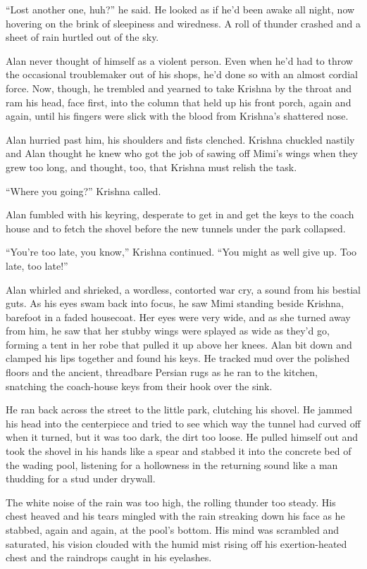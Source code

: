 ``Lost another one, huh?'' he said.  He looked as if he'd been awake
all night, now hovering on the brink of sleepiness and wiredness.  A
roll of thunder crashed and a sheet of rain hurtled out of the sky.

Alan never thought of himself as a violent person.  Even when he'd had
to throw the occasional troublemaker out of his shops, he'd done so
with an almost cordial force.  Now, though, he trembled and yearned to
take Krishna by the throat and ram his head, face first, into the
column that held up his front porch, again and again, until his
fingers were slick with the blood from Krishna's shattered nose.

Alan hurried past him, his shoulders and fists clenched.  Krishna
chuckled nastily and Alan thought he knew who got the job of sawing
off Mimi's wings when they grew too long, and thought, too, that
Krishna must relish the task.

``Where you going?'' Krishna called.

Alan fumbled with his keyring, desperate to get in and get the keys to
the coach house and to fetch the shovel before the new tunnels under
the park collapsed.

``You're too late, you know,'' Krishna continued.  ``You might as well
give up.  Too late, too late!''

Alan whirled and shrieked, a wordless, contorted war cry, a sound from
his bestial guts.  As his eyes swam back into focus, he saw Mimi
standing beside Krishna, barefoot in a faded housecoat.  Her eyes were
very wide, and as she turned away from him, he saw that her stubby
wings were splayed as wide as they'd go, forming a tent in her robe
that pulled it up above her knees.  Alan bit down and clamped his lips
together and found his keys.  He tracked mud over the polished floors
and the ancient, threadbare Persian rugs as he ran to the kitchen,
snatching the coach-house keys from their hook over the sink.

He ran back across the street to the little park, clutching his
shovel.  He jammed his head into the centerpiece and tried to see
which way the tunnel had curved off when it turned, but it was too
dark, the dirt too loose.  He pulled himself out and took the shovel
in his hands like a spear and stabbed it into the concrete bed of the
wading pool, listening for a hollowness in the returning sound like a
man thudding for a stud under drywall.

The white noise of the rain was too high, the rolling thunder too
steady.  His chest heaved and his tears mingled with the rain
streaking down his face as he stabbed, again and again, at the pool's
bottom.  His mind was scrambled and saturated, his vision clouded with
the humid mist rising off his exertion-heated chest and the raindrops
caught in his eyelashes.

